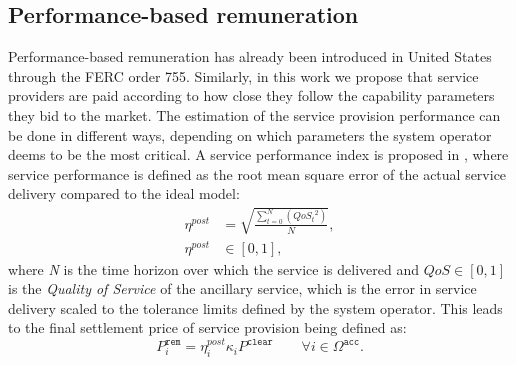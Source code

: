 \subsection{Performance-based remuneration}\label{subsec:performanceremuneration}


Performance-based remuneration has already been introduced in United States through the FERC order 755. Similarly, in this work we propose that service providers are paid according to how close they follow the capability parameters they bid to the market. The estimation of the service provision performance can be done in different ways, depending on which parameters the system operator deems to be the most critical. A service performance index is proposed in \cite{bondy2016method}, where service performance is defined as the root mean square error of the actual service delivery compared to the ideal model:
 \begin{align}
     \eta^{post} &= \sqrt{\frac{\sum^{N}_{t=0} \left( {QoS_{t}}^{2} \right)}{N}},\\
     \eta^{post} & \in [0,1],
 \end{align}
 where \emph{N} is the time horizon over which the service is delivered and $QoS \in [0,1]$ is the \emph{Quality of Service} of the ancillary service, which is the error in service delivery scaled to the tolerance limits defined by the system operator. This leads to the final settlement price of service provision being defined as:
\begin{equation}
    P^\mathtt{rem}_i = \eta^{post}_i\kappa_i  P^\mathtt{clear} \qquad \forall i \in \Omega^\mathtt{acc}.
\end{equation}
 
